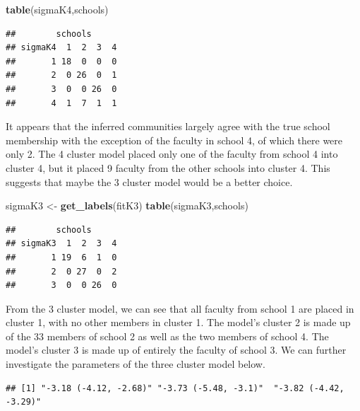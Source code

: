\documentclass[]{article}
\newenvironment{Shaded}{\begin{snugshade}}{\end{snugshade}}
\newcommand{\DecValTok}[1]{\textcolor[rgb]{0.00,0.00,0.81}{#1}}
\newcommand{\KeywordTok}[1]{\textcolor[rgb]{0.13,0.29,0.53}{\textbf{#1}}}
\newcommand{\NormalTok}[1]{#1}
\newcommand{\OperatorTok}[1]{\textcolor[rgb]{0.81,0.36,0.00}{\textbf{#1}}}
\newcommand{\StringTok}[1]{\textcolor[rgb]{0.31,0.60,0.02}{#1}}
\begin{document}
\begin{Shaded}
\begin{Highlighting}[]
\KeywordTok{table}\NormalTok{(sigmaK4,schools)}
\end{Highlighting}
\end{Shaded}

\begin{verbatim}
##        schools
## sigmaK4  1  2  3  4
##       1 18  0  0  0
##       2  0 26  0  1
##       3  0  0 26  0
##       4  1  7  1  1
\end{verbatim}

It appears that the inferred communities largely agree with the true
school membership with the exception of the faculty in school 4, of
which there were only 2. The 4 cluster model placed only one of the
faculty from school 4 into cluster 4, but it placed 9 faculty from the
other schools into cluster 4. This suggests that maybe the 3 cluster
model would be a better choice.

\begin{Shaded}
\begin{Highlighting}[]
\NormalTok{sigmaK3 <-}\StringTok{ }\KeywordTok{get_labels}\NormalTok{(fitK3)}
\KeywordTok{table}\NormalTok{(sigmaK3,schools)}
\end{Highlighting}
\end{Shaded}

\begin{verbatim}
##        schools
## sigmaK3  1  2  3  4
##       1 19  6  1  0
##       2  0 27  0  2
##       3  0  0 26  0
\end{verbatim}

From the 3 cluster model, we can see that all faculty from school 1 are
placed in cluster 1, with no other members in cluster 1. The model's
cluster 2 is made up of the 33 members of school 2 as well as the two
members of school 4. The model's cluster 3 is made up of entirely the
faculty of school 3. We can further investigate the parameters of the
three cluster model below.

\begin{Shaded}
\end{Shaded}

\begin{verbatim}
## [1] "-3.18 (-4.12, -2.68)" "-3.73 (-5.48, -3.1)"  "-3.82 (-4.42, -3.29)"
\end{verbatim}
\end{document}
